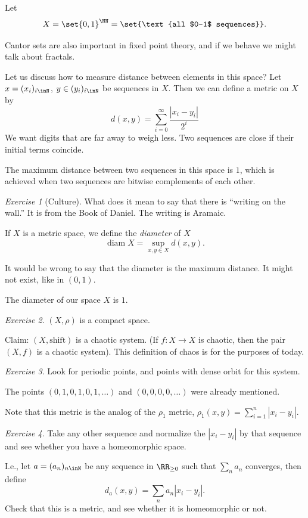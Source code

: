 \documentclass{article}
\theoremstyle{remark}
\newtheorem{exercise}{Exercise}
\newcommand\diam{\operatorname{diam}}
\begin{document}
Let \[ X=\set{0,1}^\NN=\set{\text{all $0-1$ sequences}}.\]

\begin{remark}
Cantor sets are also important in fixed point theory, and if we 
behave we might talk about fractals.
\end{remark}

Let us discuss how to measure distance between elements in this
space? Let $x=(x_i)_{i\inN}$, $y\in(y_i)_{i\inN}$ be 
sequences in $X$. Then we can define a metric on $X$ by
\[ d(x,y) = \sum_{i=0}^\infty \frac{|x_i-y_i|}{2^i} \]
We want digits that are far away to weigh less.
Two sequences are close if their initial terms coincide.

The maximum distance between two sequences in this space is
$1$, which is achieved when two sequences are bitwise complements
of each other.

\begin{exercise}[Culture]
    What does it mean to say that there is
    ``writing on the wall.''
    It is from the Book of Daniel. The writing is Aramaic.
\end{exercise}

\begin{definition}
    If $X$ is a metric space, we define the \emph{diameter}
    of $X$
    \[\diam X = \sup_{x,y\in X} d(x,y). \]

    It would be wrong to say that the diameter is the maximum
    distance. It might not exist, like in $(0,1)$.
\end{definition}

The diameter of our space $X$ is $1$.

\begin{exercise}
    $(X,\rho)$ is a compact space.
\end{exercise}

Claim: $(X,\text{shift})$ is a chaotic system.
(If $f:X\to X$ is chaotic, then the pair $(X,f)$ is a chaotic
system). This definition of chaos is for the purposes of today.

\begin{exercise}
Look for periodic points, and points with dense orbit
for this system.

The points $(0,1,0,1,0,1,\ldots)$ and $(0,0,0,0,\ldots)$ were 
already mentioned.
\end{exercise}

Note that this metric is the analog of the $\rho_1$ metric,
$\rho_1(x,y) = \sum_{i=1}^n |x_i-y_i|$.

\begin{exercise}
    Take any other sequence and normalize the $|x_i-y_i|$ by 
    that sequence and see whether you have a homeomorphic 
    space.

    I.e., let $a=(a_n)_{n\inN}$ be any sequence in $\RR_{\ge 0}$
    such that $\sum_n a_n$ converges, then define
    \[ d_a(x,y) = \sum_n a_n|x_i-y_i|.\]
    Check that this is a metric, and see whether it is 
    homeomorphic or not.
\end{exercise}
\end{document}
